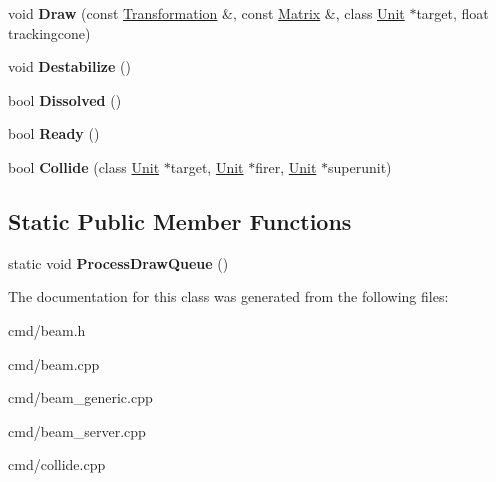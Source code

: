 \begin{DoxyCompactItemize}
\item 
void {\bfseries Draw} (const \hyperlink{structTransformation}{Transformation} \&, const \hyperlink{classMatrix}{Matrix} \&, class \hyperlink{classUnit}{Unit} $\ast$target, float trackingcone)\hypertarget{classBeam_ac075193cc965b18b3016205783b6d769}{}\label{classBeam_ac075193cc965b18b3016205783b6d769}

\item 
void {\bfseries Destabilize} ()\hypertarget{classBeam_ad145ccb64ba2989c2f3e74a046ff0fcc}{}\label{classBeam_ad145ccb64ba2989c2f3e74a046ff0fcc}

\item 
bool {\bfseries Dissolved} ()\hypertarget{classBeam_ac8c280bf812a76a6e615a4842c59305e}{}\label{classBeam_ac8c280bf812a76a6e615a4842c59305e}

\item 
bool {\bfseries Ready} ()\hypertarget{classBeam_aeae724d0ed2e5947161e376d767a379f}{}\label{classBeam_aeae724d0ed2e5947161e376d767a379f}

\item 
bool {\bfseries Collide} (class \hyperlink{classUnit}{Unit} $\ast$target, \hyperlink{classUnit}{Unit} $\ast$firer, \hyperlink{classUnit}{Unit} $\ast$superunit)\hypertarget{classBeam_a2ea05d5e1dc66e21de07be3ca38850ab}{}\label{classBeam_a2ea05d5e1dc66e21de07be3ca38850ab}

\end{DoxyCompactItemize}
\subsection*{Static Public Member Functions}
\begin{DoxyCompactItemize}
\item 
static void {\bfseries Process\+Draw\+Queue} ()\hypertarget{classBeam_ad9e12b24aa9a83b684d340f314a06fe1}{}\label{classBeam_ad9e12b24aa9a83b684d340f314a06fe1}

\end{DoxyCompactItemize}


The documentation for this class was generated from the following files\+:\begin{DoxyCompactItemize}
\item 
cmd/beam.\+h\item 
cmd/beam.\+cpp\item 
cmd/beam\+\_\+generic.\+cpp\item 
cmd/beam\+\_\+server.\+cpp\item 
cmd/collide.\+cpp\end{DoxyCompactItemize}
